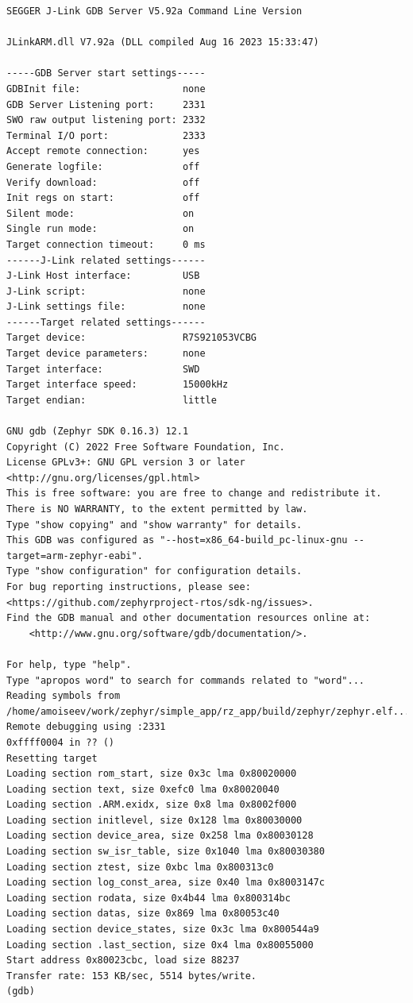 \documentclass[11pt,a4paper,oneside]{article}
\begin{document}
\begin{lstlisting}
SEGGER J-Link GDB Server V5.92a Command Line Version

JLinkARM.dll V7.92a (DLL compiled Aug 16 2023 15:33:47)

-----GDB Server start settings-----
GDBInit file:                  none
GDB Server Listening port:     2331
SWO raw output listening port: 2332
Terminal I/O port:             2333
Accept remote connection:      yes
Generate logfile:              off
Verify download:               off
Init regs on start:            off
Silent mode:                   on
Single run mode:               on
Target connection timeout:     0 ms
------J-Link related settings------
J-Link Host interface:         USB
J-Link script:                 none
J-Link settings file:          none
------Target related settings------
Target device:                 R7S921053VCBG
Target device parameters:      none
Target interface:              SWD
Target interface speed:        15000kHz
Target endian:                 little

GNU gdb (Zephyr SDK 0.16.3) 12.1
Copyright (C) 2022 Free Software Foundation, Inc.
License GPLv3+: GNU GPL version 3 or later <http://gnu.org/licenses/gpl.html>
This is free software: you are free to change and redistribute it.
There is NO WARRANTY, to the extent permitted by law.
Type "show copying" and "show warranty" for details.
This GDB was configured as "--host=x86_64-build_pc-linux-gnu --target=arm-zephyr-eabi".
Type "show configuration" for configuration details.
For bug reporting instructions, please see:
<https://github.com/zephyrproject-rtos/sdk-ng/issues>.
Find the GDB manual and other documentation resources online at:
    <http://www.gnu.org/software/gdb/documentation/>.

For help, type "help".
Type "apropos word" to search for commands related to "word"...
Reading symbols from
/home/amoiseev/work/zephyr/simple_app/rz_app/build/zephyr/zephyr.elf...
Remote debugging using :2331
0xffff0004 in ?? ()
Resetting target
Loading section rom_start, size 0x3c lma 0x80020000
Loading section text, size 0xefc0 lma 0x80020040
Loading section .ARM.exidx, size 0x8 lma 0x8002f000
Loading section initlevel, size 0x128 lma 0x80030000
Loading section device_area, size 0x258 lma 0x80030128
Loading section sw_isr_table, size 0x1040 lma 0x80030380
Loading section ztest, size 0xbc lma 0x800313c0
Loading section log_const_area, size 0x40 lma 0x8003147c
Loading section rodata, size 0x4b44 lma 0x800314bc
Loading section datas, size 0x869 lma 0x80053c40
Loading section device_states, size 0x3c lma 0x800544a9
Loading section .last_section, size 0x4 lma 0x80055000
Start address 0x80023cbc, load size 88237
Transfer rate: 153 KB/sec, 5514 bytes/write.
(gdb)
\end{lstlisting}
\end{document}
